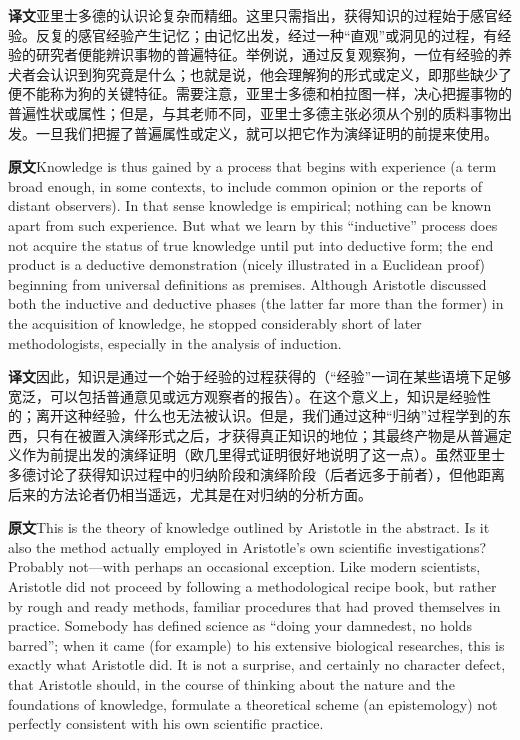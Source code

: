 \documentclass[UTF8,zihao=-4]{ctexart}
\newcommand{\BodyFont}{\fontsize{10.5pt}{15.5pt}\selectfont}
\newcommand{\origlabel}{\textbf{原文}\quad}
\newcommand{\translabel}{\textbf{译文}\quad}
\newcommand{\orig}{\par\noindent\begingroup\BodyFont\origlabel}
\newcommand{\zhline}[1]{\par\endgroup\noindent\begingroup\BodyFont\translabel #1\par\endgroup\vspace{0.35em}}
\begin{document}
\zhline{亚里士多德的认识论复杂而精细。这里只需指出，获得知识的过程始于感官经验。反复的感官经验产生记忆；由记忆出发，经过一种“直观”或洞见的过程，有经验的研究者便能辨识事物的普遍特征。举例说，通过反复观察狗，一位有经验的养犬者会认识到狗究竟是什么；也就是说，他会理解狗的形式或定义，即那些缺少了便不能称为狗的关键特征。需要注意，亚里士多德和柏拉图一样，决心把握事物的普遍性状或属性；但是，与其老师不同，亚里士多德主张必须从个别的质料事物出发。一旦我们把握了普遍属性或定义，就可以把它作为演绎证明的前提来使用。}

\orig Knowledge is thus gained by a process that begins with experience (a term broad enough, in some contexts, to include common opinion or the reports of distant observers). In that sense knowledge is empirical; nothing can be known apart from such experience. But what we learn by this ``inductive'' process does not acquire the status of true knowledge until put into deductive form; the end product is a deductive demonstration (nicely illustrated in a Euclidean proof) beginning from universal definitions as premises. Although Aristotle discussed both the inductive and deductive phases (the latter far more than the former) in the acquisition of knowledge, he stopped considerably short of later methodologists, especially in the analysis of induction.

\zhline{因此，知识是通过一个始于经验的过程获得的（“经验”一词在某些语境下足够宽泛，可以包括普通意见或远方观察者的报告）。在这个意义上，知识是经验性的；离开这种经验，什么也无法被认识。但是，我们通过这种“归纳”过程学到的东西，只有在被置入演绎形式之后，才获得真正知识的地位；其最终产物是从普遍定义作为前提出发的演绎证明（欧几里得式证明很好地说明了这一点）。虽然亚里士多德讨论了获得知识过程中的归纳阶段和演绎阶段（后者远多于前者），但他距离后来的方法论者仍相当遥远，尤其是在对归纳的分析方面。}

\orig This is the theory of knowledge outlined by Aristotle in the abstract. Is it also the method actually employed in Aristotle's own scientific investigations? Probably not---with perhaps an occasional exception. Like modern scientists, Aristotle did not proceed by following a methodological recipe book, but rather by rough and ready methods, familiar procedures that had proved themselves in practice. Somebody has defined science as ``doing your damnedest, no holds barred''; when it came (for example) to his extensive biological researches, this is exactly what Aristotle did. It is not a surprise, and certainly no character defect, that Aristotle should, in the course of thinking about the nature and the foundations of knowledge, formulate a theoretical scheme (an epistemology) not perfectly consistent with his own scientific practice.
\end{document}
